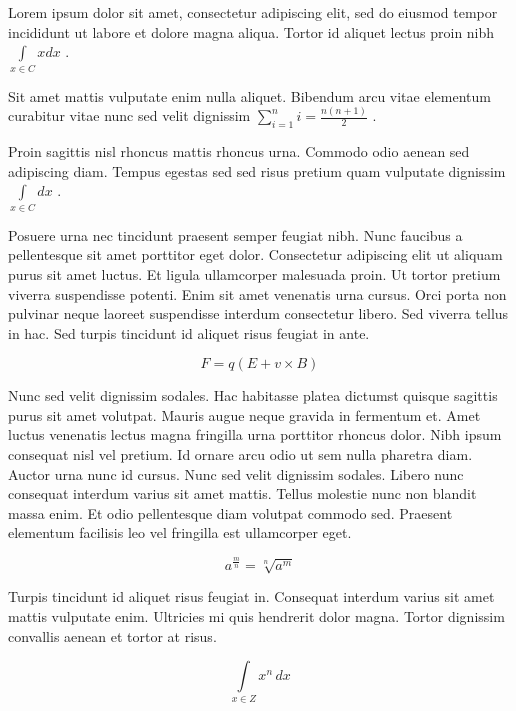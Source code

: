 \documentclass{article}
\begin{document}
	
    Lorem ipsum dolor sit amet, consectetur adipiscing elit, sed do eiusmod tempor incididunt ut labore et dolore magna aliqua. Tortor id aliquet lectus proin nibh 
    \begin{math}
    	\int\limits_{x\in C}xdx
    \end{math}
    .
    \newline
    
    Sit amet mattis vulputate enim nulla aliquet. Bibendum arcu vitae elementum curabitur vitae nunc sed velit dignissim 
    $ \sum_{i=1}^{n}i=\frac{n(n+1)}{2}  $
    .
    \newline
    
   Proin sagittis nisl rhoncus mattis rhoncus urna. Commodo odio aenean sed adipiscing diam. Tempus egestas sed sed risus pretium quam vulputate dignissim 
   \( \int\limits_{x\in C}dx \)
   .
   \newline
    
    Posuere urna nec tincidunt praesent semper feugiat nibh. Nunc faucibus a pellentesque sit amet porttitor eget dolor. Consectetur adipiscing elit ut aliquam purus sit amet luctus. Et ligula ullamcorper malesuada proin. Ut tortor pretium viverra suspendisse potenti. Enim sit amet venenatis urna cursus. Orci porta non pulvinar neque laoreet suspendisse interdum consectetur libero. Sed viverra tellus in hac. Sed turpis tincidunt id aliquet risus feugiat in ante.
    
    \[ F=q\left ( E+v \times B \right )  \]
    
    Nunc sed velit dignissim sodales. Hac habitasse platea dictumst quisque sagittis purus sit amet volutpat. Mauris augue neque gravida in fermentum et. Amet luctus venenatis lectus magna fringilla urna porttitor rhoncus dolor. Nibh ipsum consequat nisl vel pretium. Id ornare arcu odio ut sem nulla pharetra diam. Auctor urna nunc id cursus. Nunc sed velit dignissim sodales. Libero nunc consequat interdum varius sit amet mattis. Tellus molestie nunc non blandit massa enim. Et odio pellentesque diam volutpat commodo sed. Praesent elementum facilisis leo vel fringilla est ullamcorper eget.
    
    $$ a^{\frac{m}{n}}=\sqrt[n]{a^{m}} $$
    
    Turpis tincidunt id aliquet risus feugiat in. Consequat interdum varius sit amet mattis vulputate enim. Ultricies mi quis hendrerit dolor magna. Tortor dignissim convallis aenean et tortor at risus. 
    
    \begin{displaymath}
    	\int\limits_{x\in Z}\! x^{n}\, dx
    \end{displaymath}
    
\end{document}
